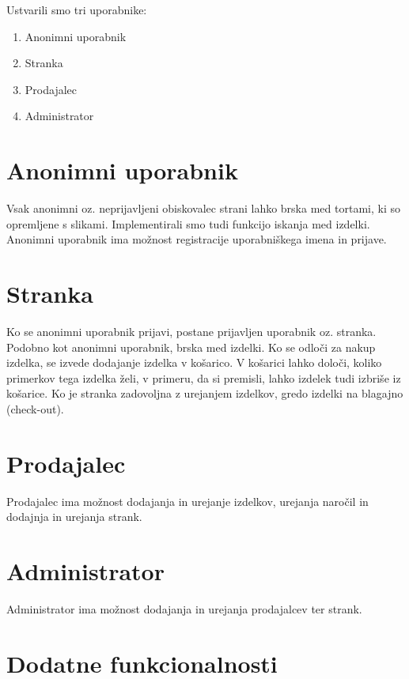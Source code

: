 \documentclass[a4paper,12pt]{report}
\begin{document}

Ustvarili smo tri uporabnike:
\begin{enumerate}
  \item Anonimni uporabnik
  \item Stranka
  \item Prodajalec
  \item Administrator
\end{enumerate}

\section{Anonimni uporabnik}

Vsak anonimni oz. neprijavljeni obiskovalec strani lahko brska med tortami, ki so opremljene s slikami. Implementirali smo tudi funkcijo iskanja med izdelki. Anonimni uporabnik ima možnost registracije uporabniškega imena in prijave.

\section{Stranka}

Ko se anonimni uporabnik prijavi, postane prijavljen uporabnik oz. stranka. Podobno kot anonimni uporabnik, brska med izdelki. Ko se odloči za nakup izdelka, se izvede dodajanje izdelka v košarico. V košarici lahko določi, koliko primerkov tega izdelka želi, v primeru, da si premisli, lahko izdelek tudi izbriše iz košarice. Ko je stranka zadovoljna z urejanjem izdelkov, gredo izdelki na blagajno (check-out).

\section{Prodajalec}

Prodajalec ima možnost dodajanja in urejanje izdelkov, urejanja naročil in dodajnja in urejanja strank.

\section{Administrator}

Administrator ima možnost dodajanja in urejanja prodajalcev ter strank.

\section{Dodatne funkcionalnosti}
\end{document}

